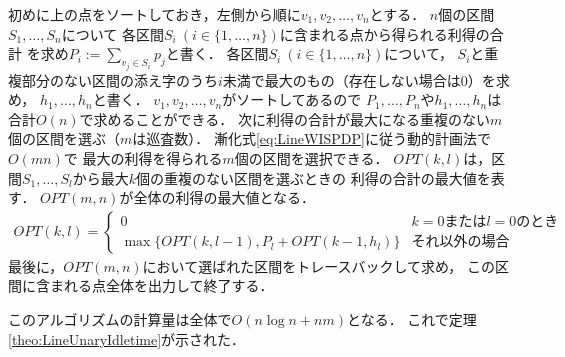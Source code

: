 初めに{\graphLine}上の点をソートしておき，左側から順に$v_1, v_2, \ldots, v_n$とする．
$n$個の区間$S_1, \ldots, S_n$について
各区間$S_i\ (i \in \{ 1, \ldots, n \})$に含まれる点から得られる利得の合計
を求め$P_i := \sum_{v_j \in S_i} p_j$と書く．
%
各区間$S_i\ (i \in \{ 1, \ldots, n \})$について，
$S_i$と重複部分のない区間の添え字のうち$i$未満で最大のもの（存在しない場合は$0$）を求め，
$h_1, \ldots, h_n$と書く．
$v_1, v_2, \ldots, v_n$がソートしてあるので
$P_1, \ldots, P_n$や$h_1, \ldots, h_n$は合計$O(n)$で求めることができる．
%
次に利得の合計が最大になる重複のない$m$個の区間を選ぶ（$m$は巡査数）．
漸化式\eqref{eq:LineWISPDP}に従う動的計画法で
$O(mn)$で
最大の利得を得られる$m$個の区間を選択できる．
$OPT(k, l)$は，区間$S_1, \ldots, S_l$から最大$k$個の重複のない区間を選ぶときの
利得の合計の最大値を表す．
$OPT(m, n)$が全体の利得の最大値となる．
\begin{align}
  \label{eq:LineWISPDP}
  OPT(k, l) = 
  \begin{cases}
    0 & \text{$k = 0$または$l = 0$のとき} \\
    \max \{
      OPT(k, l - 1), 
      P_l + OPT(k - 1, h_l)
    \}
    & \text{それ以外の場合}
  \end{cases}
\end{align}
最後に，$OPT(m, n)$において選ばれた区間をトレースバックして求め，
この区間に含まれる点全体を出力して終了する．

このアルゴリズムの計算量は全体で$O(n \log n + nm)$となる．
これで定理\ref{theo:LineUnaryIdletime}が示された．


